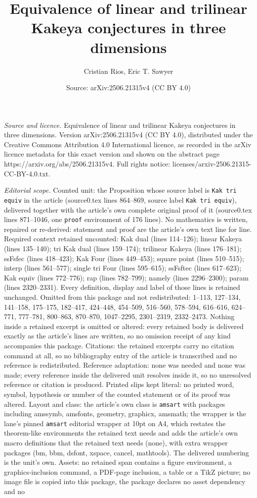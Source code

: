 \documentclass[10pt,a4paper]{amsart}
\title[Equivalence of linear and trilinear Kakeya conjectures in th]{Equivalence of linear and trilinear Kakeya conjectures in three dimensions}
\author{Cristian Rios, Eric T. Sawyer}
\date{Source: arXiv:2506.21315v4 (CC BY 4.0)}
\begin{document}
\maketitle

\noindent\emph{Source and licence.} Equivalence of linear and trilinear Kakeya conjectures in three dimensions. Version arXiv:2506.21315v4 (CC BY 4.0), distributed under the Creative Commons Attribution 4.0 International licence, as recorded in the arXiv licence metadata for this exact version and shown on the abstract page https://arxiv.org/abs/2506.21315v4. Full rights notice: licenses/arxiv-2506.21315-CC-BY-4.0.txt.\par\smallskip

\noindent\textit{Editorial scope.} Counted unit: the Proposition whose source label is \texttt{Kak tri equiv} in the article (source0.tex lines 864--869, source label \texttt{Kak tri equiv}), delivered together with the article's own complete original proof of it (source0.tex lines 871--1046, one \texttt{proof} environment of 176 lines). No mathematics is written, repaired or re-derived: statement and proof are the article's own text line for line. Required context retained uncounted: Kak dual (lines 114--126); linear Kakeya (lines 135--140); tri Kak dual (lines 159--174); trilinear Kakeya (lines 176--181); ssFsfec (lines 418--423); Kak Four (lines 449--453); square point (lines 510--515); interp (lines 561--577); single tri Four (lines 595--615); ssFsftec (lines 617--623); Kak equiv (lines 772--776); rap (lines 782--799); namely (lines 2296--2300); param (lines 2320--2331). Every definition, display and label of those lines is retained unchanged. Omitted from this package and not redistributed: 1--113, 127--134, 141--158, 175--175, 182--417, 424--448, 454--509, 516--560, 578--594, 616--616, 624--771, 777--781, 800--863, 870--870, 1047--2295, 2301--2319, 2332--2473. Nothing inside a retained excerpt is omitted or altered: every retained body is delivered exactly as the article's lines are written, so no omission receipt of any kind accompanies this package. Citations: the retained excerpts carry no citation command at all, so no bibliography entry of the article is transcribed and no reference is redistributed. Reference adaptation: none was needed and none was made; every reference inside the delivered unit resolves inside it, so no unresolved reference or citation is produced. Printed slips kept literal: no printed word, symbol, hypothesis or number of the counted statement or of its proof was altered. Layout and class: the article's own class is \texttt{amsart} with packages including amssymb, amsfonts, geometry, graphicx, amsmath; the wrapper is the lane's pinned \texttt{amsart} editorial wrapper at 10pt on A4, which restates the theorem-like environments the retained text needs and adds the article's own macro definitions that the retained text needs (none), with extra wrapper packages (bm, bbm, dsfont, xspace, cancel, mathtools). The delivered numbering is the unit's own. Assets: no retained span contains a figure environment, a graphics-inclusion command, a PDF-page inclusion, a table or a TikZ picture; no image file is copied into this package, the package declares no asset dependency and no 
\end{document}

